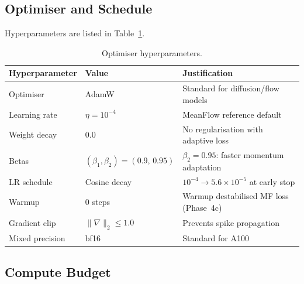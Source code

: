 \documentclass[11pt,a4paper]{article}
\begin{document}
\subsection{Optimiser and Schedule}

Hyperparameters are listed in Table~\ref{tab:optimiser}.

\begin{table}[ht]
\centering
\caption{Optimiser hyperparameters.}
\label{tab:optimiser}
\begin{tabular}{lll}
\toprule
\textbf{Hyperparameter} & \textbf{Value} & \textbf{Justification} \\
\midrule
Optimiser       & AdamW         & Standard for diffusion/flow models \\
Learning rate   & $\eta = 10^{-4}$     & MeanFlow reference default \\
Weight decay    & 0.0           & No regularisation with adaptive loss \\
Betas           & $(\beta_1, \beta_2) = (0.9,\,0.95)$  & $\beta_2{=}0.95$: faster momentum adaptation \\
LR schedule     & Cosine decay  & $10^{-4} \to 5.6{\times}10^{-5}$ at early stop \\
Warmup          & 0 steps       & Warmup destabilised MF loss (Phase~4c) \\
Gradient clip   & $\|\nabla\|_2 \le 1.0$ & Prevents spike propagation \\
Mixed precision & bf16          & Standard for A100 \\
\bottomrule
\end{tabular}
\end{table}

\subsection{Compute Budget}
\end{document}
